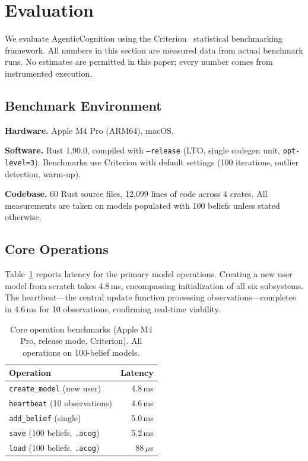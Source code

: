 \documentclass[10pt, twocolumn]{article}
\begin{document}
\section{Evaluation}
\label{sec:evaluation}

We evaluate AgenticCognition using the Criterion~\cite{criterion} statistical benchmarking framework. All numbers in this section are measured data from actual benchmark runs. No estimates are permitted in this paper; every number comes from instrumented execution.

\subsection{Benchmark Environment}
\label{sec:setup}

\textbf{Hardware.} Apple M4 Pro (ARM64), macOS.

\textbf{Software.} Rust 1.90.0, compiled with \texttt{--release} (LTO, single codegen unit, \texttt{opt-level=3}). Benchmarks use Criterion with default settings (100 iterations, outlier detection, warm-up).

\textbf{Codebase.} 60 Rust source files, 12{,}099 lines of code across 4 crates. All measurements are taken on models populated with 100 beliefs unless stated otherwise.

\subsection{Core Operations}
\label{sec:core_bench}

Table~\ref{tab:core_bench} reports latency for the primary model operations. Creating a new user model from scratch takes 4.8\,ms, encompassing initialization of all six subsystems. The heartbeat---the central update function processing observations---completes in 4.6\,ms for 10 observations, confirming real-time viability.

\begin{table}[t]
\centering
\caption{Core operation benchmarks (Apple M4 Pro, release mode, Criterion). All operations on 100-belief models.}
\label{tab:core_bench}
\footnotesize
\begin{tabular}{lr}
\toprule
\textbf{Operation} & \textbf{Latency} \\
\midrule
\texttt{create\_model} (new user) & 4.8\,ms \\
\texttt{heartbeat} (10 observations) & 4.6\,ms \\
\texttt{add\_belief} (single) & 5.0\,ms \\
\texttt{save} (100 beliefs, \texttt{.acog}) & 5.2\,ms \\
\texttt{load} (100 beliefs, \texttt{.acog}) & 88\,$\mu$s \\
\bottomrule
\end{tabular}
\end{table}
\end{document}

